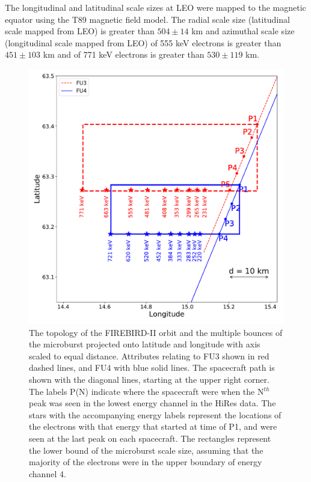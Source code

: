 \documentclass[draft,linenumbers]{agujournal}
\begin{document}
The longitudinal and latitudinal scale sizes at LEO were mapped to the magnetic equator using the T89 magnetic field model. The radial scale size (latitudinal scale mapped from LEO) is greater than $504 \pm​ 14$ km and azimuthal scale size (longitudinal scale mapped from LEO) of 555 keV electrons is greater than $451 \pm 103$ km and of 771 keV electrons is greater than $530 \pm 119$ km.

\begin{figure}
\includegraphics[width=\textwidth]{decay_microburst_distance_corrected_CH4_last_pk_drift_color_2.pdf}
\caption{The topology of the FIREBIRD-II orbit and the multiple bounces of the microburst projected onto latitude and longitude with axis scaled to equal distance. Attributes relating to FU3 shown in red dashed lines, and FU4 with blue solid lines. The spacecraft path is shown with the diagonal lines, starting at the upper right corner. The labels P(N) indicate where the spacecraft were when the N$^{th}$ peak was seen in the lowest energy channel in the HiRes data. The stars with the accompanying energy labels represent the locations of the electrons with that energy that started at time of P1, and were seen at the last peak on each spacecraft. The rectangles represent the lower bound of the microburst scale size, assuming that the majority of the electrons were in the upper boundary of energy channel 4.}
\label{map_plot}
\end{figure}
\end{document}

